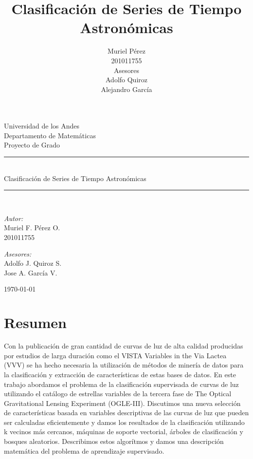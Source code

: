 \documentclass[letterpaper,12pt]{book}
\title{Clasificación de Series de Tiempo Astronómicas}
\author{Muriel Pérez\\ 201011755 \\
  Asesores\\
Adolfo Quiroz \\
Alejandro García}
\newcommand{\HRule}{\rule{\linewidth}{0.5mm}}
\begin{document}
\begin{titlepage}
\begin{center}


\huge Universidad de los Andes\\[1.5cm]

\Large Departamento de Matemáticas\\[1.5cm]

\large Proyecto de Grado\\[0.5cm]

\HRule \\[0.4cm]
{ \Large Clasificación de Series de Tiempo Astronómicas \\[0.4cm] }

\HRule \\[1.5cm]

\noindent
\begin{minipage}[t]{0.4\textwidth}
\begin{flushleft} \large
\emph{Autor:}\\
Muriel F. Pérez O. \\
201011755
\end{flushleft}
\end{minipage}%
\begin{minipage}[t]{0.6\textwidth}
\begin{flushright} \large
\emph{Asesores:} \\
Adolfo J. Quiroz S. \\
Jose A. García V.
\end{flushright}
\end{minipage}

\vfill

{\large \today}

\end{center}
\end{titlepage}
\chapter*{Resumen}

Con la publicación de gran cantidad de curvas de luz de alta calidad producidas por  estudios de larga duración como el  VISTA Variables in the Via Lactea (VVV) se ha hecho necesaria la utilización de métodos de minería de datos para la clasificación y extracción de características de estas bases de datos. En este trabajo abordamos el problema de la clasificación supervisada de curvas de luz utilizando el catálogo de  estrellas variables de la tercera fase de The Optical Gravitational Lensing Experiment (OGLE-III). Discutimos una nueva selección de características basada en variables descriptivas de las curvas de luz que pueden ser calculadas eficientemente y damos los resultados de la clasificación utilizando k vecinos más cercanos, máquinas de soporte vectorial, árboles de clasificación y bosques aleatorios. Describimos estos algorítmos y damos una descripción matemática del problema de aprendizaje supervisado.
\end{document}
